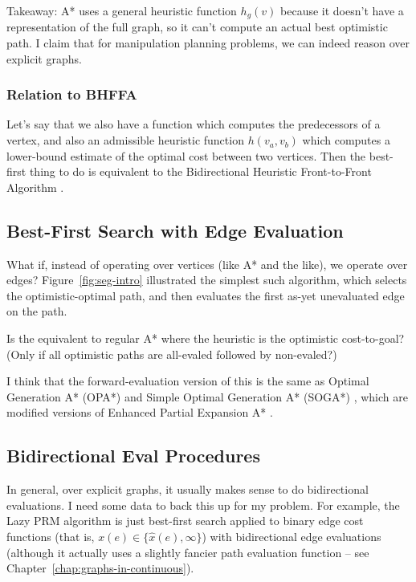 Takeaway: A* uses a general heuristic function $h_g(v)$
because it doesn't have a representation of the full graph,
so it can't compute an actual best optimistic path.
I claim that for manipulation planning problems,
we can indeed reason over explicit graphs.

\subsubsection{Relation to BHFFA}

Let's say that we also have a function which computes the predecessors
of a vertex,
and also an admissible heuristic function $h(v_a,v_b)$ which computes
a lower-bound estimate of the optimal cost between two vertices.
Then the best-first thing to do is equivalent to the
Bidirectional Heuristic Front-to-Front Algorithm \cite{sint1977bhffa}.

\subsection{Best-First Search with Edge Evaluation}

What if, instead of operating over vertices (like A* and the like),
we operate over edges?
Figure~\ref{fig:seg-intro} illustrated the simplest such algorithm,
which selects the optimistic-optimal path,
and then evaluates the first as-yet unevaluated edge on the path.

Is the equivalent to regular A*
where the heuristic is the optimistic cost-to-goal?
(Only if all optimistic paths are all-evaled followed by non-evaled?)

I think that the forward-evaluation version of this is the same as
Optimal Generation A* (OPA*) and Simple Optimal Generation A* (SOGA*)
\cite{goldenberg2013epeastar},
which are modified versions of
Enhanced Partial Expansion A* \cite{felner2012epastar}.

\subsection{Bidirectional {\sc Eval} Procedures}

In general, over explicit graphs,
it usually makes sense to do bidirectional evaluations.
I need some data to back this up for my problem.
For example,
the Lazy PRM algorithm \cite{bohlin2000lazyprm}
is just best-first search
applied to binary edge cost functions
(that is, $x(e) \in \{ \hat{x}(e), \infty \}$)
with bidirectional edge evaluations
(although it actually uses a slightly fancier path evaluation function
-- see Chapter~\ref{chap:graphs-in-continuous}).

